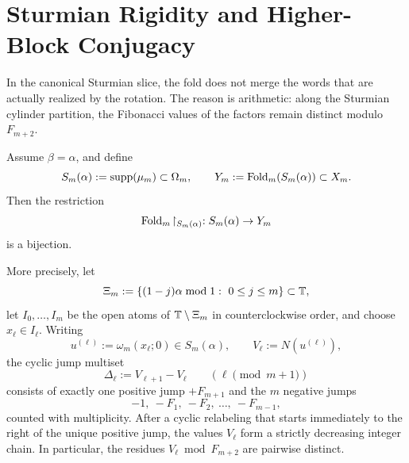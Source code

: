 \section{Sturmian Rigidity and Higher-Block Conjugacy}
\label{sec:sturmian-rigidity}

In the canonical Sturmian slice, the fold does not merge the words that are
actually realized by the rotation. The reason is arithmetic: along the
Sturmian cylinder partition, the Fibonacci values of the factors remain
distinct modulo \(F_{m+2}\).

\begin{theorem}\label{thm:sturmian-no-collision-rigidity}
Assume \(\beta=\alpha\), and define
\[
S_m(\alpha):=\operatorname{supp}(\mu_m)\subset\Omega_m,
\qquad
Y_m:=\mathrm{Fold}_m(S_m(\alpha))\subset X_m.
\]
Then the restriction
\[
\mathrm{Fold}_m\!\upharpoonright_{S_m(\alpha)}:S_m(\alpha)\to Y_m
\]
is a bijection.

More precisely, let
\[
\Xi_m:=\{(1-j)\alpha \bmod 1:\ 0\le j\le m\}\subset\mathbb{T},
\]
let \(I_0,\dots,I_m\) be the open atoms of \(\mathbb{T}\setminus \Xi_m\) in
counterclockwise order, and choose \(x_\ell\in I_\ell\). Writing
\[
u^{(\ell)}:=\omega_m(x_\ell;0)\in S_m(\alpha),
\qquad
V_\ell:=N(u^{(\ell)}),
\]
the cyclic jump multiset
\[
\Delta_\ell:=V_{\ell+1}-V_\ell
\qquad (\ell\!\!\!\!\pmod{m+1})
\]
consists of exactly one positive jump \(+F_{m+1}\) and the \(m\) negative
jumps
\[
-1,\ -F_1,\ -F_2,\ \dots,\ -F_{m-1},
\]
counted with multiplicity. After a cyclic relabeling that starts immediately to
the right of the unique positive jump, the values \(V_\ell\) form a strictly
decreasing integer chain. In particular, the residues \(V_\ell\bmod F_{m+2}\)
are pairwise distinct.
\end{theorem}

